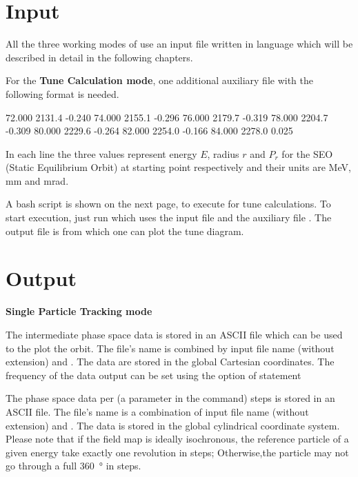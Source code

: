 \section{Input}
All the three working modes of \opalcycl use an input file written in \mad language which will be described in detail in the following chapters.

For the  {\bfseries Tune Calculation mode}, one additional auxiliary file with the following format is needed.
\begin{example}
   72.000 2131.4   -0.240
   74.000 2155.1   -0.296
   76.000 2179.7   -0.319
   78.000 2204.7   -0.309
   80.000 2229.6   -0.264
   82.000 2254.0   -0.166
   84.000 2278.0    0.025
\end{example}
In each line the three values represent energy $E$, radius $r$ and $P_r$ for the SEO (Static Equilibrium Orbit)
at starting point respectively and their units are \si{\mega\electronvolt},  \si{\milli\meter} and  \si{\milli\radian}.

A bash script  is shown on the next page, to execute \opalcycl for tune calculations.
To start execution, just run  which uses the input file  and the auxiliary file .
The output file is  from which one can plot the tune diagram.


\section{Output}
{\bfseries Single Particle Tracking mode}

The intermediate phase space data is stored in an ASCII file which can be used to
the plot the orbit. The file's name is combined by input file name (without extension) and  .
The data are stored in the global Cartesian coordinates.
The frequency of the data output can be set using the  option  of  statement 

The phase space data per  (a parameter in the  command) steps is stored in an ASCII file.
The file's name is a combination of input file name (without extension) and .
The data is stored in the global cylindrical coordinate system.
Please note that if the field map is ideally isochronous, the reference particle of a given energy take exactly one revolution in  steps;
Otherwise,the particle may not go through a full \SI{360}{\degree} in  steps.

